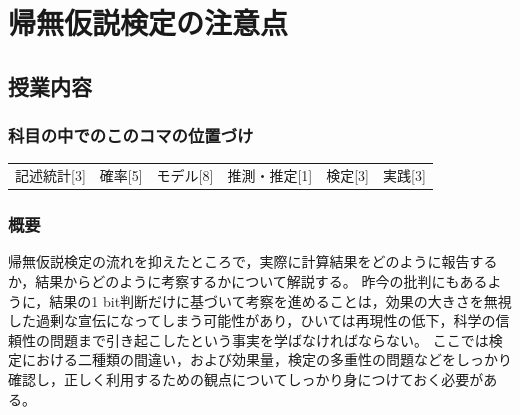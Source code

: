 \section{帰無仮説検定の注意点}
\label{s19_NHST2}

\subsection{授業内容}
\subsubsection{科目の中でのこのコマの位置づけ}
\begin{tabular}[t]{cccccc}
	記述統計[3] & 確率[5] & モデル[8] & 推測・推定[1] & 検定[3] & 実践[3]
\end{tabular}

\subsubsection{概要}
帰無仮説検定の流れを抑えたところで，実際に計算結果をどのように報告するか，結果からどのように考察するかについて解説する。
昨今の批判にもあるように，結果の1 bit判断だけに基づいて考察を進めることは，効果の大きさを無視した過剰な宣伝になってしまう可能性があり，ひいては再現性の低下，科学の信頼性の問題まで引き起こしたという事実を学ばなければならない。
ここでは検定における二種類の間違い，および効果量，検定の多重性の問題などをしっかり確認し，正しく利用するための観点についてしっかり身につけておく必要がある。

